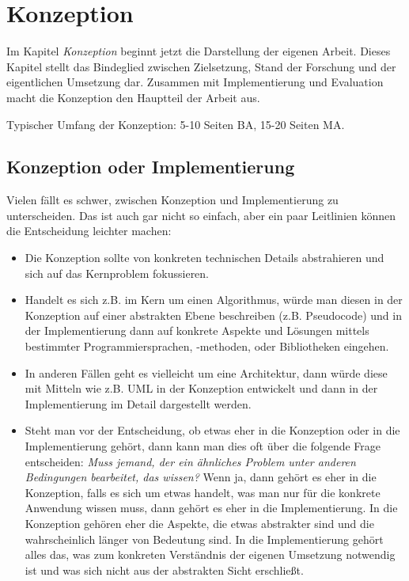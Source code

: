\chapter{Konzeption}

Im Kapitel {\em Konzeption} beginnt jetzt die Darstellung der eigenen Arbeit. Dieses Kapitel stellt das Bindeglied zwischen Zielsetzung, Stand der Forschung und der eigentlichen Umsetzung dar. Zusammen mit Implementierung und Evaluation macht die Konzeption den Hauptteil der Arbeit aus.

Typischer Umfang der Konzeption: 5-10 Seiten BA, 15-20 Seiten MA.

\section{Konzeption oder Implementierung}

Vielen fällt es schwer, zwischen Konzeption und Implementierung zu unterscheiden. Das ist auch gar nicht so einfach, aber ein paar Leitlinien können die Entscheidung leichter machen:

\begin{itemize}
    \item Die Konzeption sollte von konkreten technischen Details abstrahieren und sich auf das Kernproblem fokussieren.
    \item Handelt es sich z.B. im Kern um einen Algorithmus, würde man diesen in der Konzeption auf einer abstrakten Ebene beschreiben (z.B. Pseudocode) und in der Implementierung dann auf konkrete Aspekte und Lösungen mittels bestimmter Programmiersprachen, -methoden, oder Bibliotheken eingehen.
    \item In anderen Fällen geht es vielleicht um eine Architektur, dann würde diese mit Mitteln wie z.B. UML in der Konzeption entwickelt und dann in der Implementierung im Detail dargestellt werden.
    \item Steht man vor der Entscheidung, ob etwas eher in die Konzeption oder in die Implementierung gehört, dann kann man dies oft über die folgende Frage entscheiden: {\em Muss jemand, der ein ähnliches Problem unter anderen Bedingungen bearbeitet, das wissen?} Wenn ja, dann gehört es eher in die Konzeption, falls es sich um etwas handelt, was man nur für die konkrete Anwendung wissen muss, dann gehört es eher in die Implementierung. In die Konzeption gehören eher die Aspekte, die etwas abstrakter sind und die wahrscheinlich länger von Bedeutung sind. In die Implementierung gehört alles das, was zum konkreten Verständnis der eigenen Umsetzung notwendig ist und was sich nicht aus der abstrakten Sicht erschließt.
\end{itemize}
